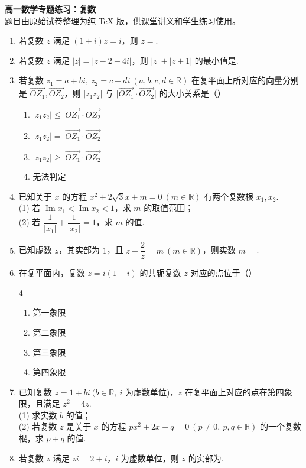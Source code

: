 \documentclass[UTF8,11pt]{ctexart}
\newcommand{\blank}{\underline{\hspace{2.8cm}}}
\newcommand{\fourchoices}[4]{%
  \begin{multicols}{4}
  \begin{enumerate}[label=\Alph*.,leftmargin=1.6em,itemsep=0pt,topsep=0pt]
  \item #1
  \item #2
  \item #3
  \item #4
  \end{enumerate}
  \end{multicols}
}
\newcommand{\longchoices}[4]{%
  \begin{enumerate}[label=\Alph*.,leftmargin=2em,itemsep=0.15em,topsep=0.2em]
  \item #1
  \item #2
  \item #3
  \item #4
  \end{enumerate}
}
\begin{document}
\begin{center}
{\LARGE \bfseries 高一数学专题练习：复数}\\[0.4em]
{\small 题目由原始试卷整理为纯 \TeX{} 版，供课堂讲义和学生练习使用。}
\end{center}
\vspace{0.5em}
\begin{enumerate}
\item 若复数 $z$ 满足 $(1+i)z=i$，则 $z=$\blank.

\item 若复数 $z$ 满足 $|z|=|z-2-4i|$，则 $|z|+|z+1|$ 的最小值是\blank.

\item 若复数 $z_1=a+bi,\ z_2=c+di\ (a,b,c,d\in\mathbb R)$ 在复平面上所对应的向量分别是 $\overrightarrow{OZ_1},\overrightarrow{OZ_2}$，则 $|z_1z_2|$ 与 $\bigl|\overrightarrow{OZ_1}\cdot\overrightarrow{OZ_2}\bigr|$ 的大小关系是（\quad）\\
\longchoices{$|z_1z_2|\le \bigl|\overrightarrow{OZ_1}\cdot\overrightarrow{OZ_2}\bigr|$}{$|z_1z_2|= \bigl|\overrightarrow{OZ_1}\cdot\overrightarrow{OZ_2}\bigr|$}{$|z_1z_2|\ge \bigl|\overrightarrow{OZ_1}\cdot\overrightarrow{OZ_2}\bigr|$}{无法判定}

\item 已知关于 $x$ 的方程 $x^2+2\sqrt3x+m=0\ (m\in\mathbb R)$ 有两个复数根 $x_1,x_2$.\\
(1) 若 $\operatorname{Im}x_1<\operatorname{Im}x_2<1$，求 $m$ 的取值范围；\\
(2) 若 $\dfrac1{|x_1|}+\dfrac1{|x_2|}=1$，求 $m$ 的值.

\item 已知虚数 $z$，其实部为 $1$，且 $z+\dfrac2z=m\ (m\in\mathbb R)$，则实数 $m=$\blank.

\item 在复平面内，复数 $z=i(1-i)$ 的共轭复数 $\bar z$ 对应的点位于（\quad）\\
\fourchoices{第一象限}{第二象限}{第三象限}{第四象限}

\item 已知复数 $z=1+bi\ (b\in\mathbb R,\ i$ 为虚数单位)，$z$ 在复平面上对应的点在第四象限，且满足 $z^2=4\bar z$.\\
(1) 求实数 $b$ 的值；\\
(2) 若复数 $z$ 是关于 $x$ 的方程 $px^2+2x+q=0\ (p\ne0,\ p,q\in\mathbb R)$ 的一个复数根，求 $p+q$ 的值.

\item 若复数 $z$ 满足 $zi=2+i$，$i$ 为虚数单位，则 $z$ 的实部为\blank.


\end{enumerate}
\end{document}
